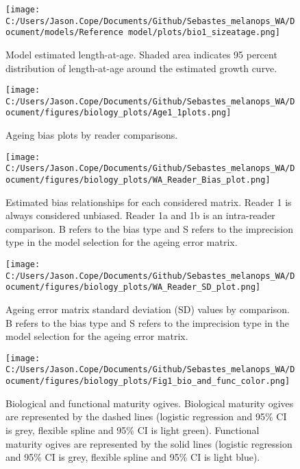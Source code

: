 \documentclass[11pt,
  english,
  letterpaper,
]{article}
\begin{document}
\begin{figure}
\centering
\texttt{[image: C:/Users/Jason.Cope/Documents/Github/Sebastes\_melanops\_WA/Document/models/Reference model/plots/bio1\_sizeatage.png]}
\caption{Model estimated length-at-age. Shaded area indicates 95 percent distribution of length-at-age around the estimated growth curve.\label{fig:len-age-ss}}
\end{figure}

\clearpage

\begin{figure}
\centering
\texttt{[image: C:/Users/Jason.Cope/Documents/Github/Sebastes\_melanops\_WA/Document/figures/biology\_plots/Age1\_1plots.png]}
\caption{Ageing bias plots by reader comparisons.\label{fig:a1-bias}}
\end{figure}

\pagebreak

\begin{figure}
\centering
\texttt{[image: C:/Users/Jason.Cope/Documents/Github/Sebastes\_melanops\_WA/Document/figures/biology\_plots/WA\_Reader\_Bias\_plot.png]}
\caption{Estimated bias relationships for each considered matrix. Reader 1 is always considered unbiased. Reader 1a and 1b is an intra-reader comparison. B refers to the bias type and S refers to the imprecision type in the model selection for the ageing error matrix.\label{fig:age-error-bias}}
\end{figure}

\pagebreak

\begin{figure}
\centering
\texttt{[image: C:/Users/Jason.Cope/Documents/Github/Sebastes\_melanops\_WA/Document/figures/biology\_plots/WA\_Reader\_SD\_plot.png]}
\caption{Ageing error matrix standard deviation (SD) values by comparison. B refers to the bias type and S refers to the imprecision type in the model selection for the ageing error matrix.\label{fig:age-error-sd}}
\end{figure}

\pagebreak

\begin{figure}
\centering
\texttt{[image: C:/Users/Jason.Cope/Documents/Github/Sebastes\_melanops\_WA/Document/figures/biology\_plots/Fig1\_bio\_and\_func\_color.png]}
\caption{Biological and functional maturity ogives. Biological maturity ogives are represented by the dashed lines (logistic regression and 95\% CI is grey, flexible spline and 95\% CI is light green). Functional maturity ogives are represented by the solid lines (logistic regression and 95\% CI is grey, flexible spline and 95\% CI is light blue).\label{fig:bio-fxn-mat-color}}
\end{figure}
\end{document}
